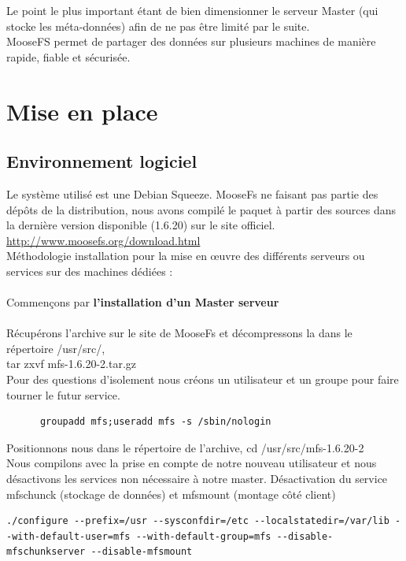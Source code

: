 \documentclass[12pt]{report}
\begin{document}
				Le point le plus important étant de bien dimensionner le serveur Master (qui stocke les méta-données)
				afin de ne pas être limité par le suite.\\

				MooseFS permet de partager des données sur plusieurs machines de manière rapide, fiable et sécurisée.

		\section{Mise en place}
			\subsection{Environnement logiciel}

Le système utilisé est une Debian Squeeze. MooseFs ne faisant pas partie des dépôts de la distribution, nous avons compilé le paquet à partir des sources dans la dernière version disponible (1.6.20) sur le site officiel.\\
\href{http://pro.hit.gemius.pl/hitredir/id=0sWa0S8ft4sTAHF1bGAAEZPcP3ziyq7f9SdhoQf7oeT.c7/url=moosefs.org/tl\_files/mfscode/mfs-1.6.20-2.tar.gz}{http://www.moosefs.org/download.html} \\
Méthodologie installation pour la mise en œuvre des différents serveurs ou services sur des machines dédiées :\\\\
Commençons par \textbf{l'installation d'un Master serveur}\\\\
Récupérons l'archive sur le site de MooseFs et décompressons la dans le répertoire /usr/src/,\\ tar zxvf mfs-1.6.20-2.tar.gz\\
Pour des questions d'isolement nous créons un utilisateur et un groupe pour faire tourner le futur service.\\
\begin{lstlisting}
	  groupadd mfs;useradd mfs -s /sbin/nologin
	  \end{lstlisting}
Positionnons nous dans le répertoire de l'archive, cd /usr/src/mfs-1.6.20-2\\
Nous compilons avec la prise en compte de notre nouveau utilisateur et nous désactivons les services non nécessaire à notre master.
Désactivation du service mfschunck (stockage de données) et mfsmount (montage côté client)
\begin{lstlisting}
./configure --prefix=/usr --sysconfdir=/etc --localstatedir=/var/lib --with-default-user=mfs --with-default-group=mfs --disable-mfschunkserver --disable-mfsmount
	  \end{lstlisting}
\end{document}
